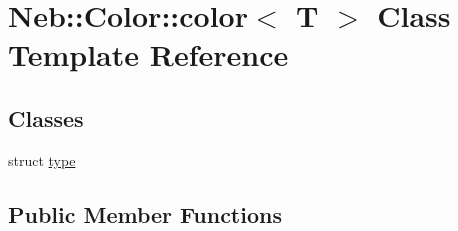 \hypertarget{classNeb_1_1Color_1_1color}{\section{Neb\-:\-:Color\-:\-:color$<$ T $>$ Class Template Reference}
\label{classNeb_1_1Color_1_1color}
}
\subsection*{Classes}
\begin{DoxyCompactItemize}
\item 
struct \hyperlink{structNeb_1_1Color_1_1color_1_1type}{type}
\end{DoxyCompactItemize}
\subsection*{Public Member Functions}
